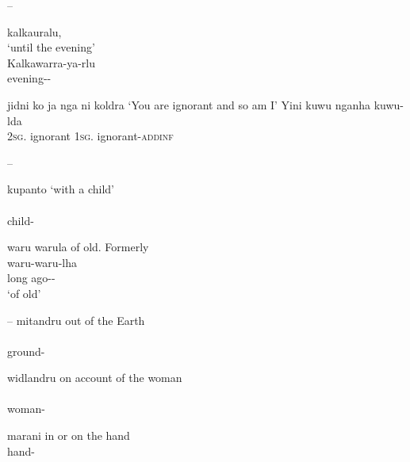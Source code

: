 \documentclass{langscibook}
\begin{document}
\begin{xlist}
\begin{xlist}
\begin{xlist}
--
\ea\label{bkm:Ref329626776}
\begin{xlist}
	\ex kalkauralu, \\
	\glt `until the evening' \\
	\citep[52]{flierl_dieri_1880}
	\ex
	\gll Kalkawarra-ya-rlu\\
	evening--\\
\end{xlist}
\z

\ea\label{bkm:Ref329626810}
\begin{xlist}
	\ex jidni ko ja nga ni koldra 
	\glt `You are ignorant and so am I'
	\ex
	\gll Yini          kuwu         nganha          kuwu-lda\\
	2\textsc{sg}.    ignorant    1\textsc{sg}.        ignorant-\textsc{addinf}\\
\end{xlist}
\z


--
\ea\label{bkm:Ref329626419}
\begin{xlist}
	\ex kupanto
	\glt `with a child' \\
	\citep[52]{flierl_dieri_1880}
	\ex
	\\
	child-\\
\end{xlist}
\z

\ea\label{bkm:Ref329626478}
\begin{xlist}
	\ex waru warula
	\glt of old. Formerly \\
	\citep[52]{flierl_dieri_1880}
	\ex
	\gll waru-waru-lha \\
	{long ago--} \\
	\glt `of old'
\end{xlist}
\z
--
\ea\label{bkm:Ref329627527}
mitandru {out of the Earth}\\
\\
ground-\\
\glt \citep[52]{flierl_dieri_1880}
\z

\ea\label{bkm:Ref329627545}
widlandru {on account of the woman}\\
\\
woman-\\
\glt \citep[52]{flierl_dieri_1880}
\z


\ea\label{bkm:Ref329627573}
marani {in or on the hand}{}
\\
hand-\\
\glt \citep[52]{flierl_dieri_1880}
\z



\end{xlist}
\end{xlist}
\end{xlist}
\end{document}
